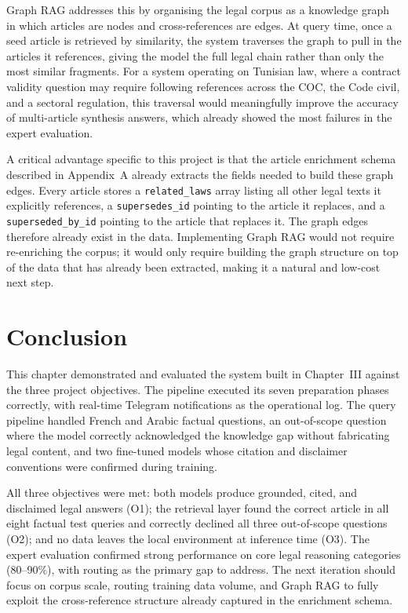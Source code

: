 \vspace{0.5em}

Graph \ac{RAG} addresses this by organising the legal corpus as a knowledge graph in which articles are nodes and cross-references are edges. At query time, once a seed article is retrieved by similarity, the system traverses the graph to pull in the articles it references, giving the model the full legal chain rather than only the most similar fragments. For a system operating on Tunisian law, where a contract validity question may require following references across the COC, the Code civil, and a sectoral regulation, this traversal would meaningfully improve the accuracy of multi-article synthesis answers, which already showed the most failures in the expert evaluation.

\vspace{0.5em}

A critical advantage specific to this project is that the article enrichment schema described in Appendix~A already extracts the fields needed to build these graph edges. Every article stores a \texttt{related\_laws} array listing all other legal texts it explicitly references, a \texttt{supersedes\_id} pointing to the article it replaces, and a \texttt{superseded\_by\_id} pointing to the article that replaces it. The graph edges therefore already exist in the data. Implementing Graph \ac{RAG} would not require re-enriching the corpus; it would only require building the graph structure on top of the data that has already been extracted, making it a natural and low-cost next step.

\section{Conclusion}
\label{sec:ch4-conclusion}

This chapter demonstrated and evaluated the system built in Chapter~III against the three project objectives. The pipeline executed its seven preparation phases correctly, with real-time Telegram notifications as the operational log. The query pipeline handled French and Arabic factual questions, an out-of-scope question where the model correctly acknowledged the knowledge gap without fabricating legal content, and two fine-tuned models whose citation and disclaimer conventions were confirmed during training.

\vspace{0.5em}

All three objectives were met: both models produce grounded, cited, and disclaimed legal answers (O1); the retrieval layer found the correct article in all eight factual test queries and correctly declined all three out-of-scope questions (O2); and no data leaves the local environment at inference time (O3). The expert evaluation confirmed strong performance on core legal reasoning categories (80--90\%), with routing as the primary gap to address. The next iteration should focus on corpus scale, routing training data volume, and Graph \ac{RAG} to fully exploit the cross-reference structure already captured in the enrichment schema.
